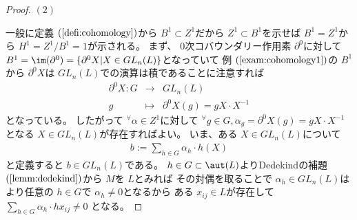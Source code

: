 \documentclass[../master_galois_theory]{subfiles}
\begin{document}
\begin{proof}
  $(2)$

  一般に定義 $(\mathrm{\ref{defi:cohomology}})$から $B^1 \subset Z^1$だから
  $Z^1 \subset B^1$を示せば $B^1 = Z^1$から $H^1 = Z^1/B^1 = 1$が示される。
  まず、 $0$次コバウンダリー作用素 $\partial^0$に対して
  $B^1 = \im(\partial^0) = \{ \partial^0 X | X \in GL_n(L) \}$となっていて
  例 $(\mathrm{\ref{exam:cohomology1}})$の $B^1$から
  $\partial^0 X$は $GL_n(L)$での演算は積であることに注意すれば
  \begin{eqnarray*}
    \partial^0 X : G & \longrightarrow & GL_n(L) \\
    g & \longmapsto & \partial^0 X(g) = gX \cdot X^{-1}
  \end{eqnarray*}
  となっている。
  したがって ${}^\forall \alpha \in Z^1$に対して
  ${}^\forall g \in G , \alpha_g = \partial^0 X(g) = gX \cdot X^{-1}$となる
  $X \in GL_n(L)$が存在すればよい。
  いま、ある $X \in GL_n(L)$について
  \begin{eqnarray*}
    b := \sum_{h \in G} \alpha_h \cdot h(X)
  \end{eqnarray*}
  と定義すると $b \in GL_n(L)$である。
  $h \in G \subset \aut(L)$より\rm{Dedekind}の補題 $(\mathrm{\ref{lemm:dedekind}})$から $M$を $L$とみれば
  その対偶を取ることで
  $\alpha_h \in GL_n(L)$はより任意の $h \in G$で $\alpha_h \neq 0$となるから
  ある $x_{ij} \in L$が存在して $\sum_{h \in G} \alpha_h \cdot hx_{ij} \neq 0$
  となる。
\end{proof}
\end{document}
